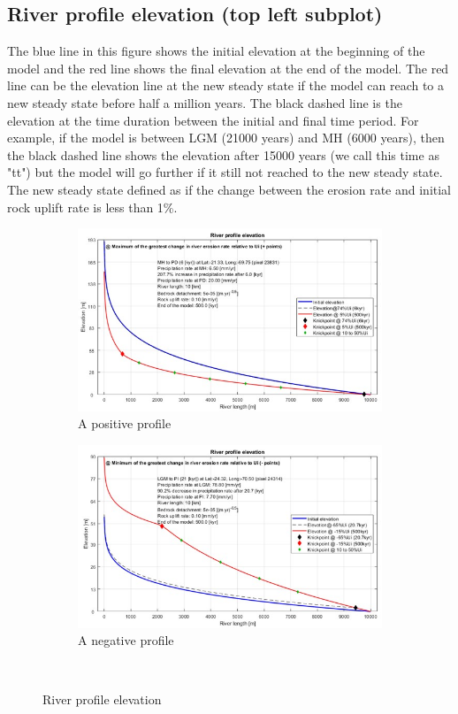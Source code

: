 \documentclass[11pt,a4paper,titlepage]{report}
\begin{document}
\subsection{River profile elevation (top left subplot)}
The blue line in this figure shows the initial elevation at the beginning of the model and the red line shows the final elevation at the end of the model. The red line can be the elevation line at the new steady state if the model can reach to a new steady state before half a million years. The black dashed line is the elevation at the time duration between the initial and final time period. For example, if the model is between LGM (21000 years) and MH (6000 years), then the black dashed line shows the elevation after 15000 years (we call this time as "tt") but the model will go further if it still not reached to the new steady state. The new steady state defined as if the change between the erosion rate and initial rock uplift rate is less than 1\%.\\

\begin{figure}[H]
    \centering
    \begin{subfigure}[H]{0.45\textwidth}
        \includegraphics[width=\textwidth]{el_p.jpg}
        \caption{A positive profile}
    \end{subfigure}
    \quad
    \begin{subfigure}[H]{0.45\textwidth}
        \includegraphics[width=\textwidth]{el_n.jpg}
        \caption{A negative profile}
    \end{subfigure}\\
    \caption[River profile elevation]{River profile elevation}
    \label{fig:elevation}    
\end{figure}
\end{document}
